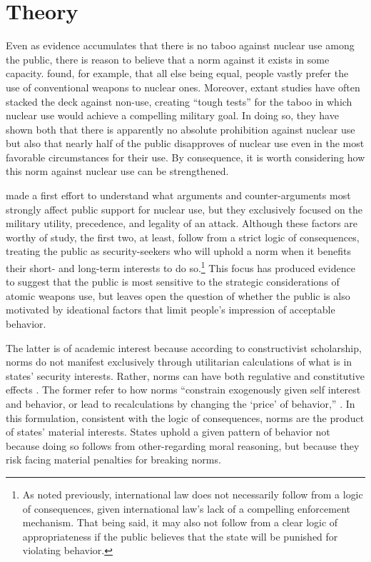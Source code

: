 \documentclass[12pt]{article}
\begin{document}
\section{Theory}

Even as evidence accumulates that there is no taboo against nuclear use among the public, there is reason to believe that a norm against it exists in some capacity. \citet{press_atomic_2013} found, for example, that all else being equal, people vastly prefer the use of conventional weapons to nuclear ones. Moreover, extant studies have often stacked the deck against non-use, creating “tough tests” for the taboo in which nuclear use would achieve a compelling military goal. In doing so, they have shown both that there is apparently no absolute prohibition against nuclear use but also that nearly half of the public disapproves of nuclear use even in the most favorable circumstances for their use. By consequence, it is worth considering how this norm against nuclear use can be strengthened.

\citet{sagan_atomic_2024} made a first effort to understand what arguments and counter-arguments most strongly affect public support for nuclear use, but they exclusively focused on the military utility, precedence, and legality of an attack. Although these factors are worthy of study, the first two, at least, follow from a strict logic of consequences, treating the public as security-seekers who will uphold a norm when it benefits their short- and long-term interests to do so.\footnote{As noted previously, international law does not necessarily follow from a logic of consequences, given international law's lack of a compelling enforcement mechanism. That being said, it may also not follow from a clear logic of appropriateness if the public believes that the state will be punished for violating behavior.} This focus has produced evidence to suggest that the public is most sensitive to the strategic considerations of atomic weapons use, but leaves open the question of whether the public is also motivated by ideational factors that limit people's impression of acceptable behavior.

The latter is of academic interest because according to constructivist scholarship, norms do not manifest exclusively through utilitarian calculations of what is in states' security interests. Rather, norms can have both regulative and constitutive effects \citep{tannenwald_nuclear_2007, wendt_social_1999}. The former refer to how norms ``constrain exogenously given self interest and behavior, or lead to recalculations by changing the ‘price’ of behavior,'' \citep[~45]{tannenwald_nuclear_2007}. In this formulation, consistent with the logic of consequences, norms are the product of states' material interests. States uphold a given pattern of behavior not because doing so follows from other-regarding moral reasoning, but because they risk facing material penalties for breaking norms.
\end{document}
